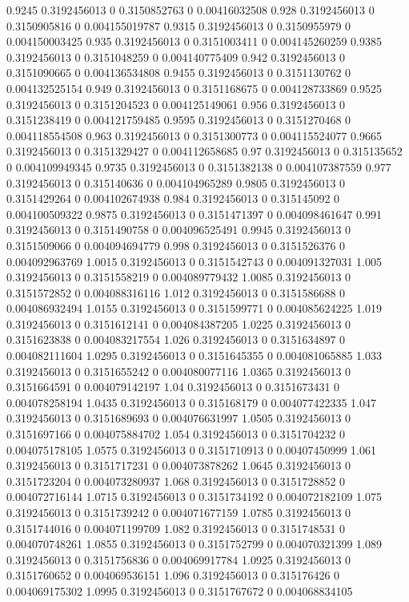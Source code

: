 {0.9245 0.3192456013 0 0.3150852763 0 0.00416032508
0.928 0.3192456013 0 0.3150905816 0 0.004155019787
0.9315 0.3192456013 0 0.3150955979 0 0.004150003425
0.935 0.3192456013 0 0.3151003411 0 0.004145260259
0.9385 0.3192456013 0 0.3151048259 0 0.004140775409
0.942 0.3192456013 0 0.3151090665 0 0.004136534808
0.9455 0.3192456013 0 0.3151130762 0 0.004132525154
0.949 0.3192456013 0 0.3151168675 0 0.004128733869
0.9525 0.3192456013 0 0.3151204523 0 0.004125149061
0.956 0.3192456013 0 0.3151238419 0 0.004121759485
0.9595 0.3192456013 0 0.3151270468 0 0.004118554508
0.963 0.3192456013 0 0.3151300773 0 0.004115524077
0.9665 0.3192456013 0 0.3151329427 0 0.004112658685
0.97 0.3192456013 0 0.315135652 0 0.004109949345
0.9735 0.3192456013 0 0.3151382138 0 0.004107387559
0.977 0.3192456013 0 0.315140636 0 0.004104965289
0.9805 0.3192456013 0 0.3151429264 0 0.004102674938
0.984 0.3192456013 0 0.315145092 0 0.004100509322
0.9875 0.3192456013 0 0.3151471397 0 0.004098461647
0.991 0.3192456013 0 0.3151490758 0 0.004096525491
0.9945 0.3192456013 0 0.3151509066 0 0.004094694779
0.998 0.3192456013 0 0.3151526376 0 0.004092963769
1.0015 0.3192456013 0 0.3151542743 0 0.004091327031
1.005 0.3192456013 0 0.3151558219 0 0.004089779432
1.0085 0.3192456013 0 0.3151572852 0 0.004088316116
1.012 0.3192456013 0 0.3151586688 0 0.004086932494
1.0155 0.3192456013 0 0.3151599771 0 0.004085624225
1.019 0.3192456013 0 0.3151612141 0 0.004084387205
1.0225 0.3192456013 0 0.3151623838 0 0.004083217554
1.026 0.3192456013 0 0.3151634897 0 0.004082111604
1.0295 0.3192456013 0 0.3151645355 0 0.004081065885
1.033 0.3192456013 0 0.3151655242 0 0.004080077116
1.0365 0.3192456013 0 0.3151664591 0 0.004079142197
1.04 0.3192456013 0 0.3151673431 0 0.004078258194
1.0435 0.3192456013 0 0.315168179 0 0.004077422335
1.047 0.3192456013 0 0.3151689693 0 0.004076631997
1.0505 0.3192456013 0 0.3151697166 0 0.004075884702
1.054 0.3192456013 0 0.3151704232 0 0.004075178105
1.0575 0.3192456013 0 0.3151710913 0 0.00407450999
1.061 0.3192456013 0 0.3151717231 0 0.004073878262
1.0645 0.3192456013 0 0.3151723204 0 0.004073280937
1.068 0.3192456013 0 0.3151728852 0 0.004072716144
1.0715 0.3192456013 0 0.3151734192 0 0.004072182109
1.075 0.3192456013 0 0.3151739242 0 0.004071677159
1.0785 0.3192456013 0 0.3151744016 0 0.004071199709
1.082 0.3192456013 0 0.3151748531 0 0.004070748261
1.0855 0.3192456013 0 0.3151752799 0 0.004070321399
1.089 0.3192456013 0 0.3151756836 0 0.004069917784
1.0925 0.3192456013 0 0.3151760652 0 0.004069536151
1.096 0.3192456013 0 0.315176426 0 0.004069175302
1.0995 0.3192456013 0 0.3151767672 0 0.004068834105
}
